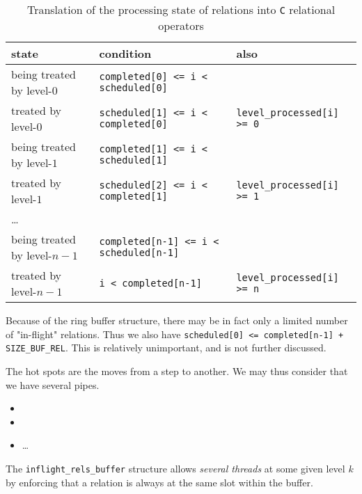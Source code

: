 \documentclass[10pt]{article}
\def\code#1{\texttt{#1}}
\begin{document}
\begin{table}
\begin{center}
    \begin{tabular}{l|l|l}
state & condition & also\\
        \hline
being treated by level-$0$ & \verb|completed[0] <= i < scheduled[0]| & \\
    treated by level-$0$   & \verb|scheduled[1] <= i < completed[0]| &
        \code{level\_processed[i] >= 0}\\
being treated by level-$1$ & \verb|completed[1] <= i < scheduled[1]| & \\
    treated by level-$1$   & \verb|scheduled[2] <= i < completed[1]| &
        \code{level\_processed[i] >= 1}\\
\ldots&&\\
being treated by level-$n-1$ & \verb|completed[n-1] <= i < scheduled[n-1]| & \\
    treated by level-$n-1$   & \verb|i < completed[n-1]| & 
        \code{level\_processed[i] >= n}\\
\end{tabular}
\caption{\label{tab:conditions}Translation of the processing state of relations into \code C
relational operators}
\end{center}
\end{table}

Because of the ring buffer structure, there may be in fact only a limited
number of "in-flight" relations. Thus we also have
\verb|scheduled[0] <= completed[n-1] + SIZE_BUF_REL|. This is relatively unimportant, and is
not further discussed.

The hot spots are the moves from a step to another. We may thus consider
that we have several pipes.
\begin{center}
    \begin{itemize}
        \item {}
        \item {}
        \item \ldots
    \end{itemize}
\end{center}

The \code{inflight\_rels\_buffer} structure allows \emph{several threads}
at some given level $k$ by enforcing that a relation is always at the
same slot within the buffer.
\end{document}
